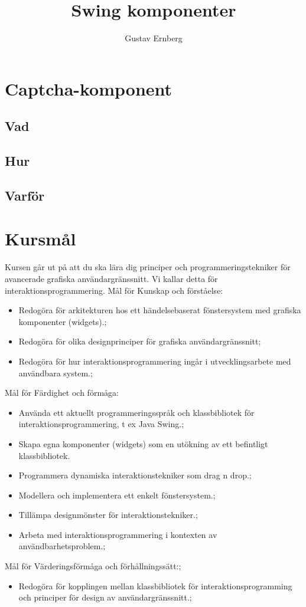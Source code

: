 \documentclass[10pt,a4paper,final]{report}
\author{Gustav Ernberg}
\title{Swing komponenter}
\begin{document}
\maketitle
\chapter{Captcha-komponent}
\section{Vad}
\pagebreak
\section{Hur}
\pagebreak
\section{Varför}
\pagebreak
\chapter{Kursmål}
Kursen går ut på att du ska lära dig principer och programmeringstekniker för avancerade grafiska användargränssnitt. Vi kallar detta för interaktionsprogrammering. 
Mål för Kunskap och förståelse:
\begin{itemize}
\item Redogöra för arkitekturen hos ett händelsebaserat fönstersystem med grafiska komponenter (widgets).;
\item Redogöra för olika designprinciper för grafiska användargränssnitt;
\item Redogöra för hur interaktionsprogrammering ingår i utvecklingsarbete med användbara system.;
\end{itemize}
Mål för Färdighet och förmåga:
\begin{itemize}
\item Använda ett aktuellt programmeringsspråk och klassbibliotek för interaktionsprogrammering, t ex Java Swing.;
\item Skapa egna komponenter (widgets) som en utökning av ett befintligt klassbibliotek.
\item Programmera dynamiska interaktionstekniker som drag n drop.;
\item Modellera och implementera ett enkelt fönstersystem.;
\item Tillämpa designmönster för interaktionstekniker.;
\item Arbeta med interaktionsprogrammering i kontexten av användbarhetsproblem.;
\end{itemize}
Mål för Värderingsförmåga och förhållningssätt:;
\begin{itemize}
\item Redogöra för kopplingen mellan klassbibliotek för interaktionsprogramming och principer för design av användargränssnitt.;
\end{itemize}
\end{document}
